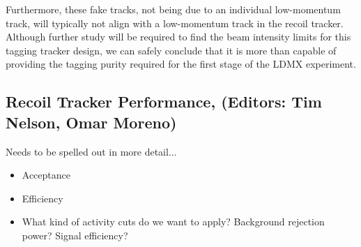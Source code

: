 Furthermore, these fake tracks, not being due to an individual low-momentum track, will typically not align with a low-momentum track in the recoil tracker.  Although further study will be required to find the beam intensity limits for this tagging tracker design, we can safely conclude that it is more than capable of providing the tagging purity required for the first stage of the LDMX experiment.


\subsection{Recoil Tracker Performance, (Editors: Tim Nelson, Omar Moreno)}

Needs to be spelled out in more detail...
\begin{itemize}
    \item Acceptance
    \item Efficiency 
    \item What kind of activity cuts do we want to apply?  Background rejection
          power?  Signal efficiency? 
\end{itemize}




